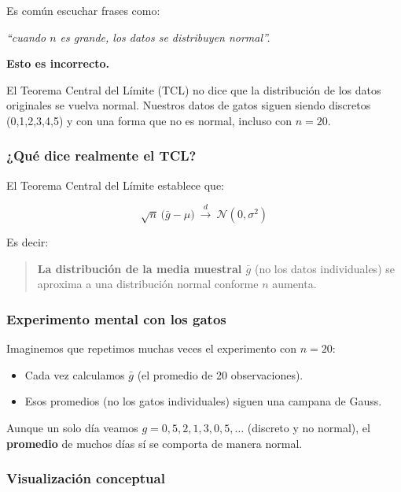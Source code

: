 Es común escuchar frases como:

\begin{center}
\textit{“cuando \(n\) es grande, los datos se distribuyen normal”.}
\end{center}

\textbf{Esto es incorrecto.}

El Teorema Central del Límite (TCL) no dice que la distribución de los datos originales se vuelva normal.  
Nuestros datos de gatos siguen siendo discretos (0,1,2,3,4,5) y con una forma que no es normal, incluso con \(n=20\).

\subsubsection{¿Qué dice realmente el TCL?}

El Teorema Central del Límite establece que:

\[
\boxed{\sqrt{n}\,\bigl(\bar{g} - \mu\bigr) \ \xrightarrow{d}\ \mathcal{N}(0,\sigma^2)}
\]

Es decir:

\begin{quote}
\textbf{La distribución de la media muestral \(\bar{g}\)} (no los datos individuales) se aproxima a una distribución normal conforme \(n\) aumenta.
\end{quote}

\subsubsection{Experimento mental con los gatos}

Imaginemos que repetimos muchas veces el experimento con \(n=20\):

\begin{itemize}
    \item Cada vez calculamos \(\bar{g}\) (el promedio de 20 observaciones).
    \item Esos promedios (no los gatos individuales) siguen una campana de Gauss.
\end{itemize}

Aunque un solo día veamos \(g = 0,5,2,1,3,0,5,\dots\) (discreto y no normal),  
el \textbf{promedio} de muchos días sí se comporta de manera normal.

\subsubsection{Visualización conceptual}

